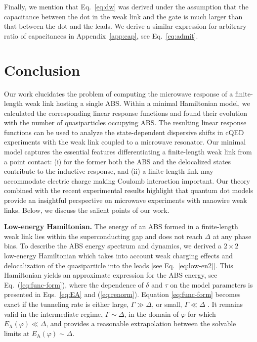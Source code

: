 \documentclass[aps,reprint,longbibliography, prb]{revtex4-2}
\begin{document}
Finally, we mention that Eq.~\eqref{eq:dw} was derived under the assumption that the capacitance between the dot in the weak link and the gate is much larger than that between the dot and the leads. We derive a similar expression for arbitrary ratio of capacitances in Appendix~\ref{app:cap}, see Eq.~\eqref{eq:admit}.

\section{Conclusion}
Our work elucidates the problem of computing the microwave response of a finite-length weak link hosting a single ABS. Within a minimal Hamiltonian model, we calculated the corresponding linear response functions and found their evolution with the number of quasiparticles occupying ABS.
The resulting linear response functions can be used to analyze the state-dependent dispersive shifts in cQED experiments with the weak link coupled to a microwave resonator. Our minimal model captures the essential features differentiating a finite-length weak link from a point contact: (i) for the former both the ABS and the delocalized states contribute to the inductive response, and (ii) a finite-length link may accommodate electric charge making Coulomb interaction important. Our theory combined with the recent experimental results \cite{fatemi2021} highlight that quantum dot models provide an insightful perspective on microwave experiments with nanowire weak links. Below, we discuss the salient points of our work.

\textbf{Low-energy Hamiltonian.} The energy of an ABS formed in a finite-length weak link lies within the superconducting gap and does not reach $\Delta$ at any phase bias.
To describe the ABS energy spectrum and dynamics, we derived a
$2\times 2$ low-energy Hamiltonian which takes into account weak charging effects and delocalization of the quasiparticle into the leads [see Eq.~\eqref{eq:low-en2}]. This Hamiltonian yields an approximate expression for the ABS energy, see Eq.~(\ref{eq:func-form}),
where the dependence of $\delta$ and $\tau$ on the model parameters is presented in Eqs.~\eqref{eq:EA} and (\ref{eq:renorm}).
Equation \eqref{eq:func-form} becomes exact if
the tunneling rate is either large, $\Gamma\gg\Delta$, or small, $\Gamma\ll\Delta$ \cite{marcus2020, kou2020}.
It remains valid in the intermediate regime, $\Gamma\sim\Delta$, in the domain of $\varphi$ for which $E_\mathrm{A}(\varphi)\ll\Delta$, and provides a reasonable extrapolation between the solvable limits at $E_\mathrm{A}(\varphi) \sim \Delta$.
\end{document}
